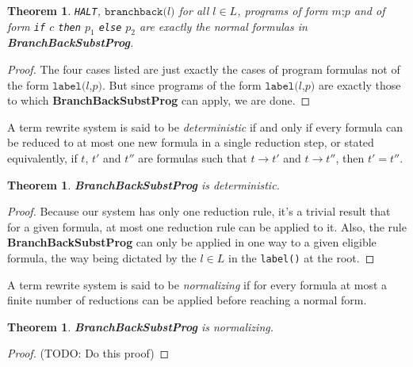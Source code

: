 \documentclass[11pt]{article}
\begin{document}
\newtheorem*{branchbacksubstnormals}{Theorem}
\begin{branchbacksubstnormals}
\texttt{HALT}, $\texttt{branchback(}l\texttt{)}$ for all $l \in L$, programs of form $m\texttt{;}p$ and of form \texttt{if} $c$ \texttt{then} $p_{1}$ \texttt{else} $p_{2}$ are exactly the normal formulas in \textbf{BranchBackSubstProg}.
\end{branchbacksubstnormals}

\begin{proof}
The four cases listed are just exactly the cases of program formulas not of the form $\texttt{label(}l\texttt{,} p\texttt{)}$.  But since programs of the form $\texttt{label(}l\texttt{,} p\texttt{)}$ are exactly those to which \textbf{BranchBackSubstProg} can apply, we are done.
\end{proof}


A term rewrite system is said to be \emph{deterministic} if and only if every formula can be reduced to at most one new formula in a single reduction step, or stated equivalently, if $t$, $t'$ and $t''$ are formulas such that $t \rightarrow t'$ and $t \rightarrow t''$, then $t' = t''$.

\newtheorem*{branchbacksubstisdeterministic}{Theorem}
\begin{branchbacksubstisdeterministic}
\textbf{BranchBackSubstProg} is deterministic.
\end{branchbacksubstisdeterministic}

\begin{proof}
Because our system has only one reduction rule, it's a trivial result that for a given formula, at most one reduction rule can be applied to it.  Also, the rule \textbf{BranchBackSubstProg} can only be applied in one way to a given eligible formula, the way being dictated by the $l \in L$ in the \texttt{label()} at the root.
\end{proof}

A term rewrite system is said to be \emph{normalizing} if for every formula at most a finite number of reductions can be applied before reaching a normal form.

\newtheorem*{branchbacksubstisnormalizing}{Theorem}
\begin{branchbacksubstisnormalizing}
\textbf{BranchBackSubstProg} is normalizing.
\end{branchbacksubstisnormalizing}

\begin{proof}
(TODO: Do this proof)
\end{proof}
\end{document}
